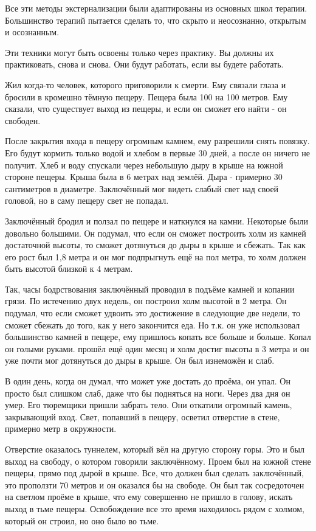 \documentclass[10pt, fleqn]{article}
\begin{document}
Все эти методы экстернализации были адаптированы из основных школ терапии. Большинство терапий пытается сделать то, что скрыто и неосознанно, открытым и осознанным.

Эти техники могут быть освоены только через практику. Вы должны их практиковать, снова и снова. Они будут работать, если вы будете работать.


Жил когда-то человек, которого приговорили к смерти. Ему связали глаза и бросили в кромешно тёмную пещеру. Пещера была 100 на 100 метров. Ему сказали, что существует выход из пещеры, и если он сможет его найти - он свободен.

После закрытия входа в пещеру огромным камнем, ему разрешили снять повязку. Его будут кормить только водой и хлебом в первые 30 дней, а после он ничего не получит. Хлеб и воду спускали через небольшую дыру в крыше на южной стороне пещеры. Крыша была в 6 метрах над землёй. Дыра - примерно 30 сантиметров в диаметре. Заключённый мог видеть слабый свет над своей головой, но в саму пещеру свет не попадал.

Заключённый бродил и ползал по пещере и наткнулся на камни. Некоторые были довольно большими. Он подумал, что если он сможет построить холм из камней достаточной высоты, то сможет дотянуться до дыры в крыше и сбежать. Так как его рост был 1,8 метра и он мог подпрыгнуть ещё на пол метра, то холм должен быть высотой близкой к 4 метрам.

Так, часы бодрствования заключённый проводил в подъёме камней и копании грязи. По истечению двух недель, он построил холм высотой в 2 метра. Он подумал, что если сможет удвоить это достижение в следующие две недели, то сможет сбежать до того, как у него закончится еда. Но т.к. он уже использовал большинство камней в пещере, ему пришлось копать все больше и больше. Копал он голыми руками. прошёл ещё один месяц и холм достиг высоты в 3 метра и он уже почти мог дотянуться до дыры в крыше. Он был изнеможён и слаб.

В один день, когда он думал, что может уже достать до проёма, он упал. Он просто был слишком слаб, даже что бы подняться на ноги. Через два дня он умер. Его тюремщики пришли забрать тело. Они откатили огромный камень, закрывающий вход. Свет, попавший в пещеру, осветил отверстие в стене, примерно метр в окружности.

Отверстие оказалось туннелем, который вёл на другую сторону горы. Это и был выход на свободу, о котором говорили заключённому. Проем был на южной стене пещеры, прямо под дырой в крыше. Все, что должен был сделать заключённый, это проползти 70 метров и он оказался бы на свободе. Он был так сосредоточен на светлом проёме в крыше, что ему совершенно не пришло в голову, искать выход в тьме пещеры. Освобождение все это время находилось рядом с холмом, который он строил, но оно было во тьме.
\end{document}
